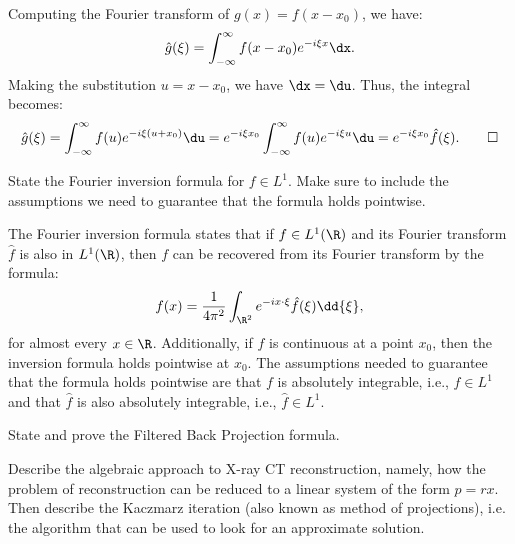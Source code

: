 \begin{solution}
  Computing the Fourier transform of $g(x) = f(x - x_0)$, we have:
  \[%
    \hat{g}(\xi) = \int_{-\infty}^{\infty} f(x - x_0) e^{-i \xi x} \dx
  .\]%
  Making the substitution $u = x - x_0$, we have $\dx = \du$. Thus, the integral becomes:
  \[%
    \hat{g}(\xi) = \int_{-\infty}^{\infty} f(u) e^{-i \xi (u + x_0)} \du = e^{-i \xi x_0} \int_{-\infty}^{\infty} f(u) e^{-i \xi u} \du = e^{-i \xi x_0} \hat{f}(\xi)
  .\qedhere\]%
\end{solution}

\begin{problem}[8]
  State the Fourier inversion formula for $f \in L^1$. Make sure to include the assumptions we need to guarantee that the formula holds pointwise.
\end{problem}

\begin{solution}
  The Fourier inversion formula states that if $f \in L^1(\R)$ and its Fourier transform $\hat{f}$ is also in $L^1(\R)$, then $f$ can be recovered from its Fourier transform by the formula:
  \[%
    f(x) = \frac{1}{4\pi^2} \int_{\R^2} e^{-ix \cdot \xi} \hat{f}(\xi) \dd{\xi}
  ,\]%
  for almost every $x \in \R$. Additionally, if $f$ is continuous at a point $x_0$, then the inversion formula holds pointwise at $x_0$. The assumptions needed to guarantee that the formula holds pointwise are that $f$ is absolutely integrable, i.e., $f \in L^1$ and that $\hat{f}$ is also absolutely integrable, i.e., $\hat{f} \in L^1$.
\end{solution}

\begin{problem}[9]
  State and prove the Filtered Back Projection formula.
\end{problem}

\begin{solution}
\end{solution}

\begin{problem}[10]
  Describe the algebraic approach to X-ray CT reconstruction, namely, how the problem of reconstruction can be reduced to a linear system of the form $p = rx$. Then describe the Kaczmarz iteration (also known as method of projections), i.e. the algorithm that can be used to look for an approximate solution.
\end{problem}


